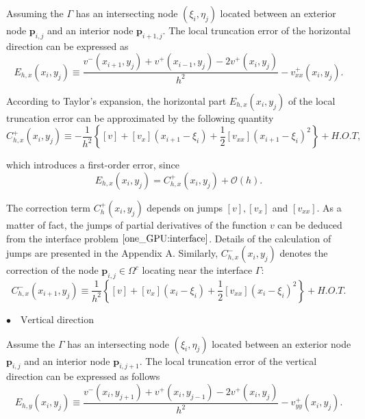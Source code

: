 \documentclass{article}
\begin{document}
Assuming the $\Gamma$ has an intersecting node $(\xi_{i}, \eta_{j})$ located between an exterior  node $\mathbf{p}_{i,j}$ and an interior node $\mathbf{p}_{i+1,j}$. The local truncation error of the horizontal direction can be expressed as
\begin{equation}
E_{h,x}\left(x_{i},y_{j}\right) \equiv \frac{v^{-}\left(x_{i+1},y_{j}\right)+v^{+}\left(x_{i-1},y_{j}\right)-2 v^{+}\left(x_{i},y_{j}\right)}{h^{2}}-v^{+}_{xx}\left(x_{i},y_{j}\right).
\end{equation}

According to Taylor's expansion, the horizontal part $E_{h, x}\left(x_{i}, y_{j}\right)$ of the local truncation error can be approximated by the following quantity
$$
C_{h, x}^{+}\left(x_{i}, y_{j}\right) \equiv -\frac{1}{h^{2}}\left\{[v]+\left[v_{x}\right]\left(x_{i+1}-\xi_{i}\right)+\frac{1}{2}\left[v_{x x}\right]\left(x_{i+1}-\xi_{i}\right)^{2}\right\} + H.O.T,
$$

which introduces a first-order error, since
$$
E_{h, x}\left(x_{i}, y_{j}\right)=C_{h, x}^{+}\left(x_{i}, y_{j}\right)+\mathcal{O}(h).
$$

The correction term $C^{+}_{h}(x_{i}, y_{j})$ depends on jumps $[v], [v_{x}]$ and $[v_{x x}]$. As a matter of fact, the jumps of partial derivatives of the function $v$ can be deduced from the interface problem $\eqref{one_GPU:interface}$. Details of the calculation of jumps are presented in the Appendix A. Similarly, $C^{-}_{h,x}(x_{i}, y_{j})$ denotes the correction of the node $\mathbf{p}_{i,j} \in \Omega^{c}$ locating near the interface $\Gamma$:
$$
C_{h, x}^{-}\left(x_{i+1}, y_{j}\right) \equiv \frac{1}{h^{2}}\left\{[v]+\left[v_{x}\right]\left(x_{i}-\xi_{i}\right)+\frac{1}{2}\left[v_{x x}\right]\left(x_{i}-\xi_{i}\right)^{2}\right\} + H.O.T.
$$

\noindent 
$\bullet \quad \text{Vertical direction}$

Assume the $\Gamma$ has an intersecting node $(\xi_{i}, \eta_{j})$ located between an exterior  node $\mathbf{p}_{i,j}$ and an interior node $\mathbf{p}_{i,j+1}$. The local truncation error of the vertical direction can be expressed as follows
\begin{equation}
E_{h,y}\left(x_{i},y_{j}\right) \equiv \frac{v^{-}\left(x_{i},y_{j+1}\right)+v^{+}\left(x_{i},y_{j-1}\right)-2 v^{+}\left(x_{i},y_{j}\right)}{h^{2}}-v^{+}_{yy}\left(x_{i},y_{j}\right).
\end{equation}
\end{document}
